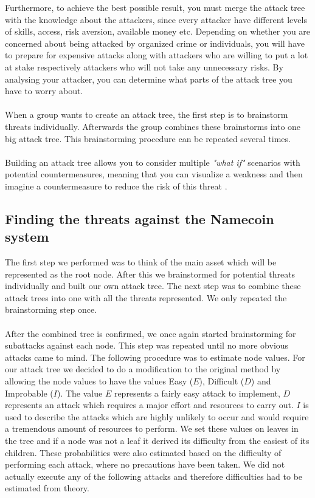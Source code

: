 \documentclass[frame, english]{idamasterthesis}
\begin{document}
Furthermore, to achieve the best possible result, you must merge the attack tree with the knowledge about the attackers, since every attacker have different levels of skills, access, risk aversion, available money etc. Depending on whether you are concerned about being attacked by organized crime or individuals, you will have to prepare for expensive attacks along with attackers who are willing to put a lot at stake respectively attackers who will not take any unnecessary risks. By analysing your attacker, you can determine what parts of the attack tree you have to worry about. \\\\
When a group wants to create an attack tree, the first step is to brainstorm threats individually. Afterwards the group combines these brainstorms into one big attack tree. This brainstorming procedure can be repeated several times. \\\\
Building an attack tree allows you to consider multiple \emph{"what if"} scenarios with potential countermeasures, meaning that you can visualize a weakness and then imagine a countermeasure to reduce the risk of this threat \cite{tree}.

\pagebreak
\subsection{Finding the threats against the Namecoin system}
The first step we performed was to think of the main asset which will be represented as the root node. After this we brainstormed for potential threats individually and built our own attack tree. The next step was to combine these attack trees into one with all the threats represented. We only repeated the brainstorming step once.\\\\
After the combined tree is confirmed, we once again started brainstorming for subattacks against each node. This step was repeated until no more obvious attacks came to mind. The following procedure was to estimate node values. For our attack tree we decided to do a modification to the original method by allowing the node values to have the values Easy ($E$), Difficult ($D$) and Improbable ($I$). The value $E$ represents a fairly easy attack to implement, $D$ represents an attack which requires a major effort and resources to carry out. $I$ is used to describe the attacks which are highly unlikely to occur and would require a tremendous amount of resources to perform. We set these values on leaves in the tree and if a node was not a leaf it derived its difficulty from the easiest of its children. These probabilities were also estimated based on the difficulty of performing each attack, where no precautions have been taken. We did not actually execute any of the following attacks and therefore difficulties had to be estimated from theory.
\end{document}
